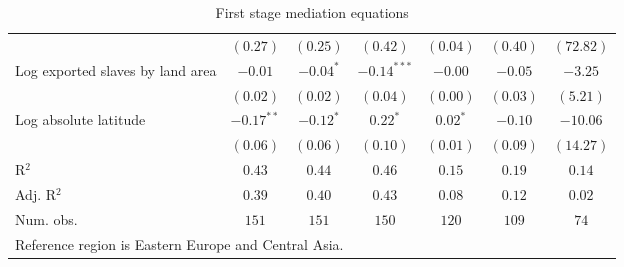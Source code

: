 \begin{sidewaystable}
\begin{center}
{\begin{tabular}{l c c c c c c}
                                 & $(0.27)$     & $(0.25)$       & $(0.42)$        & $(0.04)$   & $(0.40)$        & $(72.82)$        \\
Log exported slaves by land area & $-0.01$      & $-0.04^{*}$    & $-0.14^{***}$   & $-0.00$    & $-0.05$         & $-3.25$          \\
                                 & $(0.02)$     & $(0.02)$       & $(0.04)$        & $(0.00)$   & $(0.03)$        & $(5.21)$         \\
Log absolute latitude            & $-0.17^{**}$ & $-0.12^{*}$    & $0.22^{*}$      & $0.02^{*}$ & $-0.10$         & $-10.06$         \\
                                 & $(0.06)$     & $(0.06)$       & $(0.10)$        & $(0.01)$   & $(0.09)$        & $(14.27)$        \\
\hline
R$^2$                            & $0.43$       & $0.44$         & $0.46$          & $0.15$     & $0.19$          & $0.14$           \\
Adj. R$^2$                       & $0.39$       & $0.40$         & $0.43$          & $0.08$     & $0.12$          & $0.02$           \\
Num. obs.                        & $151$        & $151$          & $150$           & $120$      & $109$           & $74$             \\
\hline
\multicolumn{7}{l}{\scriptsize{Reference region is Eastern Europe and Central Asia.}}
\end{tabular}
}
\caption{First stage mediation equations}
\label{MediationTable}
\end{center}
\end{sidewaystable}
